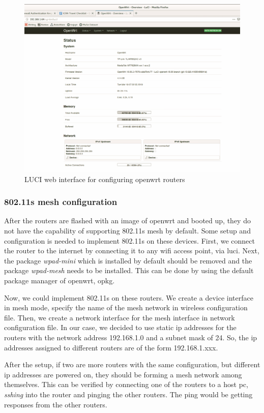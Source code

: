 \begin{figure}[h]
	\centering
	\includegraphics[scale=0.3]{Pictures/luci2.png}
	\caption{LUCI web interface for configuring openwrt routers}
	\label{fig: luci}
\end{figure}

\subsubsection{802.11s mesh configuration}
After the routers are flashed with an image of openwrt and booted up, they do not have the capability of supporting 802.11s mesh by default. Some setup and configuration is needed to implement 802.11s on these devices. First, we connect the router to the internet by connecting it to any wifi access point, via luci. Next, the package \textit{wpad-mini} which is installed by default should be removed and the package \textit{wpad-mesh} needs to be installed. This can be done by using the default package manager of openwrt, opkg.

Now, we could implement 802.11s on these routers. We create a device interface in mesh mode, specify the name of the mesh network in wireless configuration file. Then, we create a network interface for the mesh interface in network configuration file. In our case, we decided to use static ip addresses for the routers with the network address 192.168.1.0 and a subnet mask of 24. So, the ip addresses assigned to different routers are of the form 192.168.1.xxx.

After the setup, if two are more routers with the same configuration, but different ip addresses are powered on, they should be forming a mesh network among themselves. This can be verified by connecting one of the routers to a host pc, \textit{sshing} into the router and pinging the other routers. The ping would be getting responses from the other routers.

